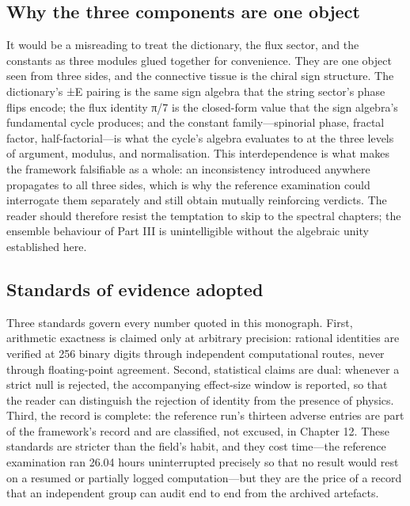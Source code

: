 \documentclass[10pt]{article}
\begin{document}
\subsection{Why the three components are one object}\label{sec:35}
It would be a misreading to treat the dictionary, the flux sector, and the constants as three modules glued together for convenience. They are one object seen from three sides, and the connective tissue is the chiral sign structure. The dictionary's ±E pairing is the same sign algebra that the string sector's phase flips encode; the flux identity π/7 is the closed-form value that the sign algebra's fundamental cycle produces; and the constant family---spinorial phase, fractal factor, half-factorial---is what the cycle's algebra evaluates to at the three levels of argument, modulus, and normalisation. This interdependence is what makes the framework falsifiable as a whole: an inconsistency introduced anywhere propagates to all three sides, which is why the reference examination could interrogate them separately and still obtain mutually reinforcing verdicts. The reader should therefore resist the temptation to skip to the spectral chapters; the ensemble behaviour of Part III is unintelligible without the algebraic unity established here.

\subsection{Standards of evidence adopted}\label{sec:36}
Three standards govern every number quoted in this monograph. First, arithmetic exactness is claimed only at arbitrary precision: rational identities are verified at 256 binary digits through independent computational routes, never through floating-point agreement. Second, statistical claims are dual: whenever a strict null is rejected, the accompanying effect-size window is reported, so that the reader can distinguish the rejection of identity from the presence of physics. Third, the record is complete: the reference run's thirteen adverse entries are part of the framework's record and are classified, not excused, in Chapter 12. These standards are stricter than the field's habit, and they cost time---the reference examination ran 26.04 hours uninterrupted precisely so that no result would rest on a resumed or partially logged computation---but they are the price of a record that an independent group can audit end to end from the archived artefacts.
\end{document}
